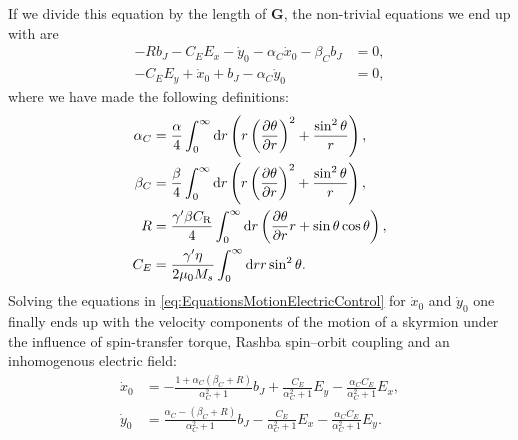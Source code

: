If we divide this equation by the length of $\mathbold{G}$, the non-trivial equations we end up with are
\begin{subequations}
\label{eq:EquationsMotionElectricControl}
\begin{align}
- R b_J - C_E E_x - \dot{y}_0 - \alpha_C \dot{x}_0 - \beta_C b_J &= 0, \\
-C_E E_y + \dot{x}_0 + b_J -\alpha_C\dot{y}_0 &= 0,
\end{align}
\end{subequations}
where we have made the following definitions:
\begin{subequations}
\begin{align}
\alpha_C &= \frac{\alpha}{4} \int_0^{\infty} \operatorname{d}\!{r} \left(r\left(\frac{\partial \theta}{\partial r}\right)^2+\frac{\sin^2\theta}{r}\right), \\
\beta_C &=\frac{\beta}{4} \int_0^{\infty} \operatorname{d}\!{r} \left(r\left(\frac{\partial \theta}{\partial r}\right)^2+\frac{\sin^2\theta}{r}\right), \\
R &= \frac{\gamma'\beta C_{\text{R}}}{4} \int_0^{\infty} \operatorname{d}\!{r} \left(\frac{\partial \theta}{\partial r} r + \sin\theta\cos\theta \right), \label{eq:Rconst}\\
C_E &= \frac{\gamma' \eta}{2\mu_0 M_s}\int_0^{\infty}\operatorname{d}\!{r} r\sin^2\theta.
\end{align}
\end{subequations}
Solving the equations in \eqref{eq:EquationsMotionElectricControl} for $\dot{x}_0$ and $\dot{y}_0$ one finally ends up with the velocity components of the motion of a skyrmion under the influence of spin-transfer torque, Rashba spin--orbit coupling and an inhomogenous electric field:
\begin{subequations}
\label{eq:ElectricalSkyrmionVComponents}
\begin{align}
\dot{x}_0 &= - \frac{1+\alpha_C(\beta_C + R)}{\alpha_C^2+1}b_J + \frac{C_E}{\alpha_C^2+1}E_y - \frac{\alpha_C C_E}{\alpha_C^2+1}E_x, \\
\dot{y}_0 &= \frac{\alpha_C-(\beta_C + R)}{\alpha_C^2+1}b_J - \frac{C_E}{\alpha_C^2+1}E_x - \frac{\alpha_C C_E}{\alpha_C^2+1}E_y.
\end{align}
\end{subequations}
